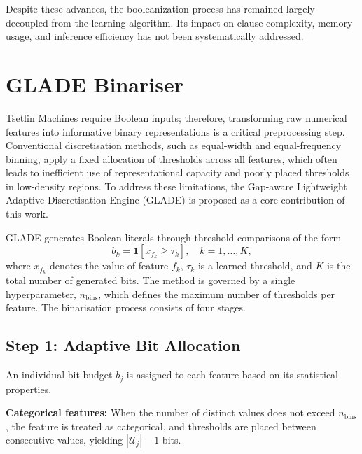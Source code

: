 \documentclass[journal,twoside,web]{ieeecolor}
\begin{document}
Despite these advances, the booleanization process has remained
largely decoupled from the learning algorithm. Its impact on clause
complexity, memory usage, and inference efficiency has not been
systematically addressed.


\section{GLADE Binariser}
\label{sec:glade}

Tsetlin Machines require Boolean inputs; therefore, transforming raw
numerical features into informative binary representations is a
critical preprocessing step. Conventional discretisation methods,
such as equal-width and equal-frequency binning, apply a fixed
allocation of thresholds across all features, which often leads to
inefficient use of representational capacity and poorly placed
thresholds in low-density regions. To address these limitations, the
Gap-aware Lightweight Adaptive Discretisation Engine (GLADE) is
proposed as a core contribution of this work.

GLADE generates Boolean literals through threshold comparisons of
the form
\begin{equation}
  b_k = \mathbf{1}\!\left[ x_{f_k} \geq \tau_k \right],
  \quad k = 1, \ldots, K,
\end{equation}
where $x_{f_k}$ denotes the value of feature $f_k$, $\tau_k$ is a
learned threshold, and $K$ is the total number of generated bits.
The method is governed by a single hyperparameter,
$n_\text{bins}$, which defines the maximum number of thresholds per
feature. The binarisation process consists of four stages.

\subsection{Step 1: Adaptive Bit Allocation}
\label{subsec:budget}

An individual bit budget $b_j$ is assigned to each feature based on
its statistical properties.

\textbf{Categorical features:} When the number of distinct values
does not exceed $n_\text{bins}$, the feature is treated as
categorical, and thresholds are placed between consecutive values,
yielding $|\mathcal{U}_j| - 1$ bits.
\end{document}
